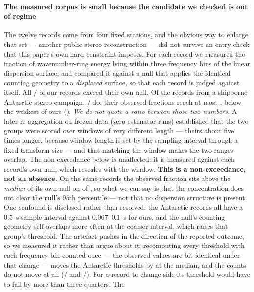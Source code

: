 \documentclass[review]{elsarticle}
\begin{document}
\paragraph{The measured corpus is small because the candidate we checked is out of
regime} The twelve records come from four fixed stations, and the obvious way to
enlarge that set --- another public stereo reconstruction --- did not survive an entry
check that this paper's own hard constraint imposes. For each record we measured the
fraction of wavenumber-ring energy lying within three frequency bins of the linear
dispersion surface, and compared it against a null that applies the identical counting
geometry to a \emph{displaced} surface, so that each record is judged against itself.
All \RFourBCtrlPass{}/\RFourBCtrlN{} of our records exceed their own null. Of the
records from a shipborne Antarctic stereo campaign, \RFourBTreatPass{}/\RFourBTreatN{}
do: their observed fractions reach at most \RFourBTreatMax{}, below the weakest of ours
(\RFourBCtrlMin{}). \emph{We do not quote a ratio between those two numbers.} A later
re-aggregation on frozen data (zero estimator runs) established that the two groups were
scored over windows of very different length --- theirs about five times longer, because
window length is set by the sampling interval through a fixed transform size --- and that
matching the window makes the two ranges overlap. The non-exceedance below is unaffected:
it is measured against each record's own null, which rescales with the window. \textbf{This is a non-exceedance, not an absence.}
On the same records the observed fraction sits above the \emph{median} of its own null
on \RFourBTreatN{} of \RFourBTreatN{}, so what we can say is that the concentration does
not clear the null's
$95$th percentile --- not that no dispersion structure is present. One confound is
disclosed rather than resolved: the Antarctic records all have a $0.5$~s sample interval
against $0.067$--$0.1$~s for ours, and the null's counting geometry self-overlaps more
often at the coarser interval, which raises that group's threshold. The artefact pushes
in the direction of the reported outcome, so we measured it rather than argue about it:
recomputing every threshold with each frequency bin counted once --- the observed values
are bit-identical under that change --- moves the Antarctic thresholds by
\RFourCDropMed{} at the median, and the counts do not move at all
(\RFourCCtrlPass{}/\RFourBCtrlN{} and \RFourCTreatPass{}/\RFourBTreatN{}). For a record
to change side its threshold would have to fall by more than three quarters. The
\end{document}
